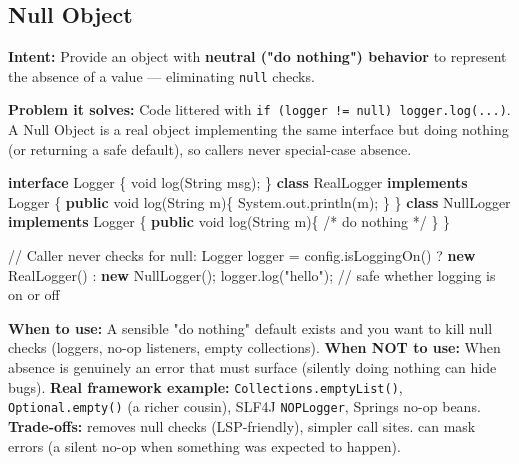 \documentclass[11pt]{article}
\newenvironment{Shaded}{\begin{snugshade}}{\end{snugshade}}
\newcommand{\BuiltInTok}[1]{\textcolor[rgb]{0.50,0.55,0.55}{#1}}
\newcommand{\CommentTok}[1]{\textcolor[rgb]{0.48,0.49,0.49}{#1}}
\newcommand{\DataTypeTok}[1]{\textcolor[rgb]{0.16,0.50,0.73}{#1}}
\newcommand{\FunctionTok}[1]{\textcolor[rgb]{0.56,0.27,0.68}{#1}}
\newcommand{\KeywordTok}[1]{\textcolor[rgb]{0.81,0.81,0.76}{\textbf{#1}}}
\newcommand{\NormalTok}[1]{\textcolor[rgb]{0.81,0.81,0.76}{#1}}
\newcommand{\OperatorTok}[1]{\textcolor[rgb]{0.81,0.81,0.76}{#1}}
\newcommand{\StringTok}[1]{\textcolor[rgb]{0.96,0.31,0.31}{#1}}
\begin{document}
\subsection{Null Object}\label{null-object}

\textbf{Intent:} Provide an object with \textbf{neutral ("do nothing") behavior} to represent the absence of a value --- eliminating \texttt{null} checks.

\textbf{Problem it solves:} Code littered with \texttt{if\ (logger\ !=\ null)\ logger.log(...)}. A Null Object is a real object implementing the same interface but doing nothing (or returning a safe default), so callers never special-case absence.


\begin{Shaded}
\begin{Highlighting}[]
\KeywordTok{interface} \BuiltInTok{Logger} \OperatorTok{\{} \DataTypeTok{void} \FunctionTok{log}\OperatorTok{(}\BuiltInTok{String}\NormalTok{ msg}\OperatorTok{);} \OperatorTok{\}}
\KeywordTok{class}\NormalTok{ RealLogger }\KeywordTok{implements} \BuiltInTok{Logger} \OperatorTok{\{} \KeywordTok{public} \DataTypeTok{void} \FunctionTok{log}\OperatorTok{(}\BuiltInTok{String}\NormalTok{ m}\OperatorTok{)\{} \BuiltInTok{System}\OperatorTok{.}\FunctionTok{out}\OperatorTok{.}\FunctionTok{println}\OperatorTok{(}\NormalTok{m}\OperatorTok{);} \OperatorTok{\}} \OperatorTok{\}}
\KeywordTok{class}\NormalTok{ NullLogger }\KeywordTok{implements} \BuiltInTok{Logger} \OperatorTok{\{} \KeywordTok{public} \DataTypeTok{void} \FunctionTok{log}\OperatorTok{(}\BuiltInTok{String}\NormalTok{ m}\OperatorTok{)\{} \CommentTok{/* do nothing */} \OperatorTok{\}} \OperatorTok{\}}

\CommentTok{// Caller never checks for null:}
\BuiltInTok{Logger}\NormalTok{ logger }\OperatorTok{=}\NormalTok{ config}\OperatorTok{.}\FunctionTok{isLoggingOn}\OperatorTok{()} \OperatorTok{?} \KeywordTok{new} \FunctionTok{RealLogger}\OperatorTok{()} \OperatorTok{:} \KeywordTok{new} \FunctionTok{NullLogger}\OperatorTok{();}
\NormalTok{logger}\OperatorTok{.}\FunctionTok{log}\OperatorTok{(}\StringTok{"hello"}\OperatorTok{);}   \CommentTok{// safe whether logging is on or off}
\end{Highlighting}
\end{Shaded}

\textbf{When to use:} A sensible "do nothing" default exists and you want to kill null checks (loggers, no-op listeners, empty collections). \textbf{When NOT to use:} When absence is genuinely an error that must surface (silently doing nothing can hide bugs). \textbf{Real framework example:} \texttt{Collections.emptyList()}, \texttt{Optional.empty()} (a richer cousin), SLF4J \texttt{NOPLogger}, Spring\textquotesingle s no-op beans. \textbf{Trade-offs:} removes null checks (LSP-friendly), simpler call sites. can mask errors (a silent no-op when something was expected to happen).
\end{document}
